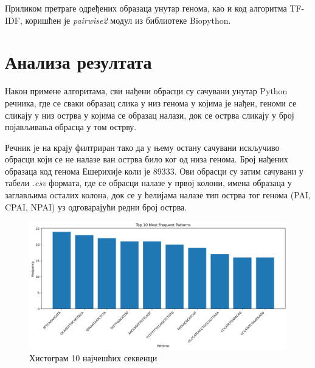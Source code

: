 \documentclass[12pt]{article}
\begin{document}
Приликом претраге одређених образаца унутар генома, као и код алгоритма TF-IDF, коришћен је \textit{pairwise2} модул из библиотеке Biopython.

\section{Анализа резултата}

Након примене алгоритама, сви нађени обрасци су сачувани унутар Python речника, где се сваки образац слика у низ генома у којима је нађен, геноми се сликају у низ острва у којима се образац налази, док се острва сликају у број појављивања обрасца у том острву.

Речник је на крају филтриран тако да у њему остану сачувани искључиво обрасци који се не налазе ван острва било ког од низа генома. Број нађених образаца код генома Ешерихије коли је 89333. Ови обрасци су затим сачувани у табели \textit{.csv} формата, где се обрасци налазе у првој колони, имена образаца у заглављима осталих колона, док се у ћелијама налазе тип острва тог генома (PAI, CPAI, NPAI) уз одговарајући редни број острва.

\begin{figure}[htbp]
    \centering
    \includegraphics[width=\linewidth]{images/top_10_hist.png}
    \caption{Хистограм 10 најчешћих секвенци}
    \label{fig:top10hist}
\end{figure}
\end{document}
